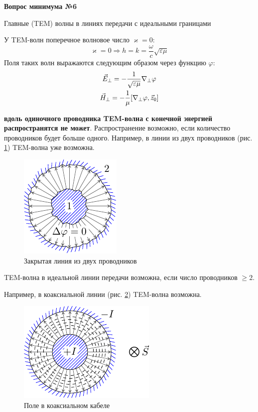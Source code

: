 \documentclass[a4paper,14pt]{extarticle}
\newcommand{\ticket}[1] {
\newpage
\hypertarget{num#1}{}
\begin{center}
	\textbf{Вопрос минимума №#1 }
\end{center}
}
\begin{document}
\ticket{6}
Главные (TEM) волны в линиях передачи с идеальными границами

У TEM-волн поперечное волновое число $\varkappa=0$:
\begin{equation*}
\varkappa=0 \Rightarrow h=k= \frac{\omega}{c}\sqrt{\varepsilon \mu}
\end{equation*}
Поля таких волн выражаются следующим образом через функцию $\varphi$:
\begin{gather*}
\label{eperp}
\vec{E}_\perp=-\frac{1}{\sqrt{\varepsilon \mu}}\nabla_\perp \varphi\\
\vec{H}_\perp=-\frac{1}{\mu}\qty[\nabla_\perp \varphi,\vec{z}_0]
\end{gather*}

\textbf{вдоль одиночного проводника TEM-волна с конечной энергией распространятся не может}. Распространение возможно, если количество проводников будет больше одного. Например, в линии из двух проводников (рис. \ref{fig:lect4:4}) TEM-волна уже возможна.

\begin{figure}[h!]
	\centering
	\includegraphics[scale=1.5]{img/lect4_ris4}
	\caption{Закрытая линия из двух проводников}
	\label{fig:lect4:4}
\end{figure}


 TEM-волна в идеальной линии передачи возможна, если число проводников $\geq 2$.

Например, в коаксиальной линии (рис. \ref{fig:lect4:6}) TEM-волна возможна.

\begin{figure}[h!]
	\centering
	\includegraphics[scale=1.5]{img/lect4_ris6}
	\caption{Поле в коаксиальном кабеле}
	\label{fig:lect4:6}
\end{figure}
\end{document}
